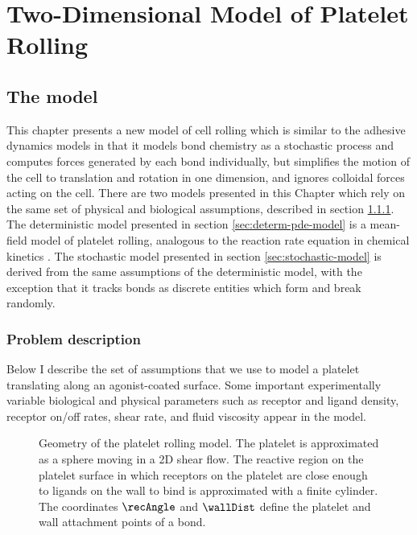 
\chapter{Two-Dimensional Model of Platelet Rolling}
\label{cha:two-dimens-roll}

\section{The model}
\label{sec:model}

This chapter presents a new model of cell rolling which is similar to
the adhesive dynamics models in that it models bond chemistry as a
stochastic process and computes forces generated by each bond
individually, but simplifies the motion of the cell to translation and
rotation in one dimension, and ignores colloidal forces acting on the
cell. There are two models presented in this Chapter which rely on the
same set of physical and biological assumptions, described in section
\ref{sec:problem-description}. The deterministic model presented in
section \ref{sec:determ-pde-model} is a mean-field model of platelet
rolling, analogous to the reaction rate equation in chemical kinetics
\cite{Gillespie2007}. The stochastic model presented in section
\ref{sec:stochastic-model} is derived from the same assumptions of the
deterministic model, with the exception that it tracks bonds as
discrete entities which form and break randomly.

\subsection{Problem description}
\label{sec:problem-description}

Below I describe the set of assumptions that we use to model a
platelet translating along an agonist-coated surface. Some important
experimentally variable biological and physical parameters such as
receptor and ligand density, receptor on/off rates, shear rate, and
fluid viscosity appear in the model.

\begin{figure}
  \centering
  
  \caption[Geometry of the platelet rolling model]{Geometry of the
    platelet rolling model. The platelet is approximated as a sphere
    moving in a 2D shear flow. The reactive region on the platelet
    surface in which receptors on the platelet are close enough to
    ligands on the wall to bind is approximated with a finite
    cylinder. The coordinates $\recAngle$ and $\wallDist$ define the
    platelet and wall attachment points of a bond.}
  \label{fig:model-geometry}
\end{figure}

